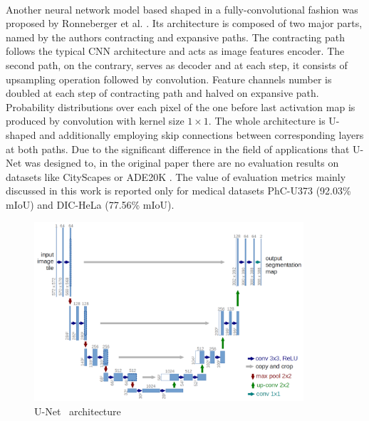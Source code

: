 \documentclass{article}
\begin{document}
\paragraph{}
Another neural network model based shaped in a fully-convolutional fashion was proposed by Ronneberger et al. \cite{unet}. Its architecture is composed of two major parts, named by the authors contracting and expansive paths. The contracting path follows the typical CNN architecture and acts as image features encoder. The second path, on the contrary, serves as decoder and at each step, it consists of upsampling operation followed by convolution. Feature channels number is doubled at each step of contracting path and halved on expansive path. Probability distributions over each pixel of the one before last activation map is produced by convolution with kernel size $1 \times 1$. The whole architecture is U-shaped and additionally employing skip connections between corresponding layers at both paths. Due to the significant difference in the field of applications that U-Net \cite{unet} was designed to, in the original paper there are no evaluation results on datasets like CityScapes \cite{cityscapes} or ADE20K \cite{ade20k}. The value of evaluation metrics mainly discussed in this work is reported only for medical datasets PhC-U373 \cite{phcu373} (92.03\% mIoU) and DIC-HeLa \cite{dichela} (77.56\% mIoU).
\begin{figure}[!htb]
    \centering
  \includegraphics[width=10cm, keepaspectratio]{images/u-net-architecture.png}
  \caption{U-Net~\cite{unet} architecture}
  \label{fig:u-net-architecture}
\end{figure}
\end{document}
